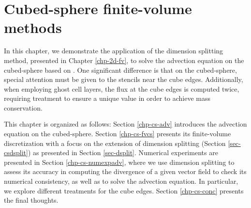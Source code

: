 \chapter{Cubed-sphere finite-volume methods}
\label{chp-cs-fv}
In this chapter, we demonstrate the application of the dimension splitting method,
presented in Chapter \ref{chp-2d-fv}, to solve the advection equation on the cubed-sphere based on \citet{putman:2007}.
One significant difference is that on the cubed-sphere, special attention must be given to the stencils near the cube edges.
Additionally, when employing ghost cell layers, the flux at the cube edges is computed twice,
requiring treatment to ensure a unique value in order to achieve mass conservation.

This chapter is organized as follows: Section \ref{chp-cs-adv} introduces the advection equation on the cubed-sphere.
Section \ref{chp-cs-fvcs} presents its finite-volume discretization with a focus on the extension of dimension splitting (Section \ref{sec-csdsplit}) 
as presented in Section \ref{sec-dsplit}.
Numerical experiments are presented in Section \ref{chp-cs-numexpadv}, where we use dimension splitting to assess its
accuracy in computing the divergence of a given vector field to check its numerical consistency, as well as to solve the advection equation.
In particular, we explore different treatments for the cube edges. Section \ref{chp-cs-conc} presents the final thoughts.


